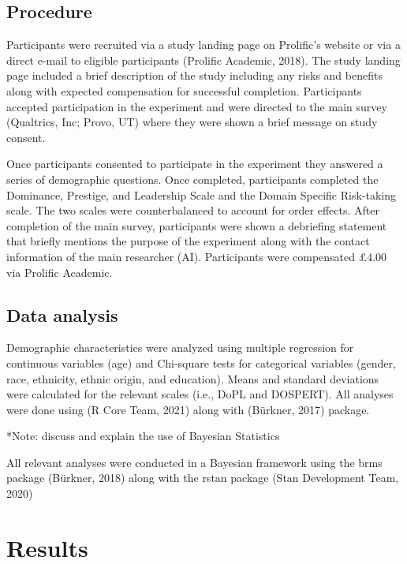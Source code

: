 \documentclass[
  english,
  ,doc, 12pt, a4paper,floatsintext]{apa7}
\begin{document}
\hypertarget{procedure}{%
\subsection{Procedure}\label{procedure}}

Participants were recruited via a study landing page on Prolific's website or via a direct e-mail to eligible participants (Prolific Academic, 2018). The study landing page included a brief description of the study including any risks and benefits along with expected compensation for successful completion. Participants accepted participation in the experiment and were directed to the main survey (Qualtrics, Inc; Provo, UT) where they were shown a brief message on study consent.

Once participants consented to participate in the experiment they answered a series of demographic questions. Once completed, participants completed the Dominance, Prestige, and Leadership Scale and the Domain Specific Risk-taking scale. The two scales were counterbalanced to account for order effects. After completion of the main survey, participants were shown a debriefing statement that briefly mentions the purpose of the experiment along with the contact information of the main researcher (AI). Participants were compensated £4.00 via Prolific Academic.

\hypertarget{data-analysis}{%
\subsection{Data analysis}\label{data-analysis}}

Demographic characteristics were analyzed using multiple regression for continuous variables (age) and Chi-square tests for categorical variables (gender, race, ethnicity, ethnic origin, and education). Means and standard deviations were calculated for the relevant scales (i.e., DoPL and DOSPERT). All analyses were done using (R Core Team, 2021) along with (Bürkner, 2017) package.

*Note: discuss and explain the use of Bayesian Statistics

All relevant analyses were conducted in a Bayesian framework using the brms package (Bürkner, 2018) along with the rstan package (Stan Development Team, 2020)

\hypertarget{results}{%
\section{Results}\label{results}}
\end{document}
